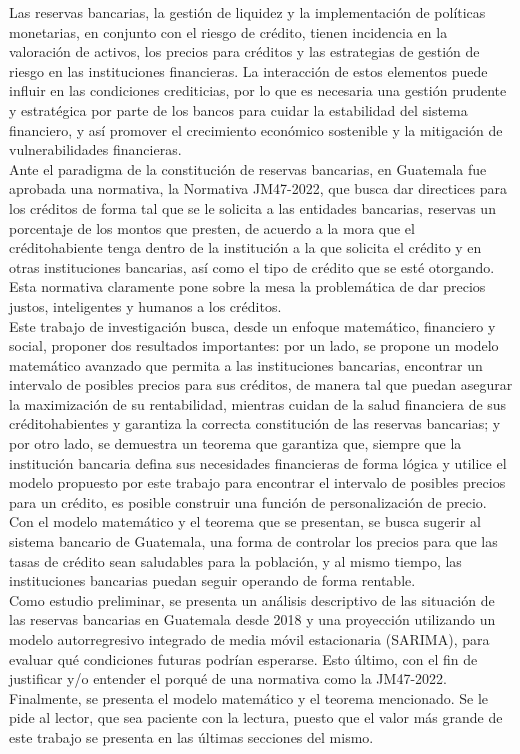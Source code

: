 Las reservas bancarias, la gestión de liquidez y la implementación de políticas monetarias, en conjunto con el riesgo de crédito, tienen incidencia en la valoración de activos, los precios para créditos y las estrategias de gestión de riesgo en las instituciones financieras. La interacción de estos elementos  puede influir en las condiciones crediticias, por lo que es necesaria una gestión prudente y estratégica por parte de los bancos para cuidar la estabilidad del sistema financiero, y así promover el crecimiento económico sostenible  y la mitigación de vulnerabilidades financieras. \\ 

Ante el paradigma de la constitución de reservas bancarias, en Guatemala fue aprobada una normativa, la Normativa JM47-2022, que busca dar directices para los créditos de forma tal que se le solicita a las entidades bancarias, reservas un porcentaje de los montos que presten, de acuerdo a la mora que el créditohabiente tenga dentro de la institución a la que solicita el crédito y en otras instituciones bancarias, así como el tipo de crédito que se esté otorgando. Esta normativa claramente pone sobre la mesa la problemática de dar precios justos, inteligentes y humanos a los créditos.  \\

Este trabajo de investigación busca, desde un enfoque matemático, financiero y social, proponer dos resultados importantes: por un lado, se propone un modelo matemático avanzado que permita a las instituciones bancarias, encontrar un intervalo de posibles precios para sus créditos, de manera tal que puedan asegurar la maximización de su rentabilidad, mientras cuidan de la salud financiera de sus créditohabientes y garantiza la correcta constitución de las reservas bancarias; y por otro lado, se demuestra un teorema que garantiza que, siempre que la institución bancaria defina sus necesidades financieras de forma lógica y utilice el modelo propuesto por este trabajo para encontrar el intervalo de posibles precios para un crédito, es posible construir una función de personalización de precio. \\

Con el modelo matemático y el teorema que se presentan, se busca sugerir al sistema bancario de Guatemala, una forma de controlar los precios para que las tasas de crédito sean saludables para la población, y al mismo tiempo, las instituciones bancarias puedan seguir operando de forma rentable. \\

Como estudio preliminar, se presenta un análisis descriptivo de las situación de las reservas bancarias en Guatemala desde 2018 y una proyección utilizando un modelo autorregresivo integrado de media móvil estacionaria (SARIMA), para evaluar qué condiciones futuras podrían esperarse. Esto último, con el fin de justificar y/o entender el porqué de una normativa como la JM47-2022. Finalmente, se presenta el modelo matemático y el teorema mencionado. Se le pide al lector, que sea paciente con la lectura, puesto que el valor más grande de este trabajo se presenta en las últimas secciones del mismo.